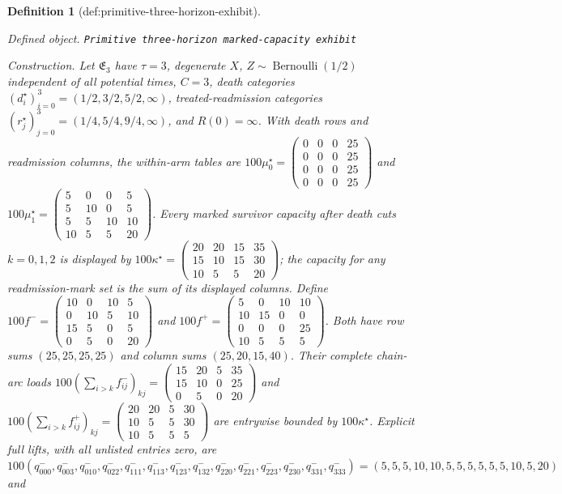 \documentclass{article}
\newtheorem{definition}{Definition}
\begin{document}
\begin{definition}[def:primitive-three-horizon-exhibit]\label{def:primitive-three-horizon-exhibit}
\par\smallskip\noindent\emph{Defined object.} \texttt{Primitive three-\allowbreak{}horizon marked-\allowbreak{}capacity exhibit}
\par\smallskip\noindent\emph{Construction.} Let \(\mathfrak E_3\) have \(\tau=3\), degenerate \(X\), \(Z\sim\operatorname{Bernoulli}(1/2)\) independent of all potential times, \(C=3\), death categories \((d_i^\star)_{i=0}^3=(1/2,3/2,5/2,\infty)\), treated-readmission categories \((r_j^\star)_{j=0}^3=(1/4,5/4,9/4,\infty)\), and \(R(0)=\infty\). With death rows and readmission columns, the within-arm tables are \(100\mu_0^\star=\begin{pmatrix}0&0&0&25\\0&0&0&25\\0&0&0&25\\0&0&0&25\end{pmatrix}\) and \(100\mu_1^\star=\begin{pmatrix}5&0&0&5\\5&10&0&5\\5&5&10&10\\10&5&5&20\end{pmatrix}\). Every marked survivor capacity after death cuts \(k=0,1,2\) is displayed by \(100\kappa^\star=\begin{pmatrix}20&20&15&35\\15&10&15&30\\10&5&5&20\end{pmatrix}\); the capacity for any readmission-mark set is the sum of its displayed columns. Define \(100f^-=\begin{pmatrix}10&0&10&5\\0&10&5&10\\15&5&0&5\\0&5&0&20\end{pmatrix}\) and \(100f^+=\begin{pmatrix}5&0&10&10\\10&15&0&0\\0&0&0&25\\10&5&5&5\end{pmatrix}\). Both have row sums \((25,25,25,25)\) and column sums \((25,20,15,40)\). Their complete chain-arc loads \(100(\sum_{i>k}f^-_{ij})_{kj}=\begin{pmatrix}15&20&5&35\\15&10&0&25\\0&5&0&20\end{pmatrix}\) and \(100(\sum_{i>k}f^+_{ij})_{kj}=\begin{pmatrix}20&20&5&30\\10&5&5&30\\10&5&5&5\end{pmatrix}\) are entrywise bounded by \(100\kappa^\star\). Explicit full lifts, with all unlisted entries zero, are \(100(q^-_{000},q^-_{003},q^-_{010},q^-_{022},q^-_{111},q^-_{113},q^-_{123},q^-_{132},q^-_{220},q^-_{221},q^-_{223},q^-_{230},q^-_{331},q^-_{333})=(5,5,5,10,10,5,5,5,5,5,5,10,5,20)\) and 
\end{definition}
\end{document}
